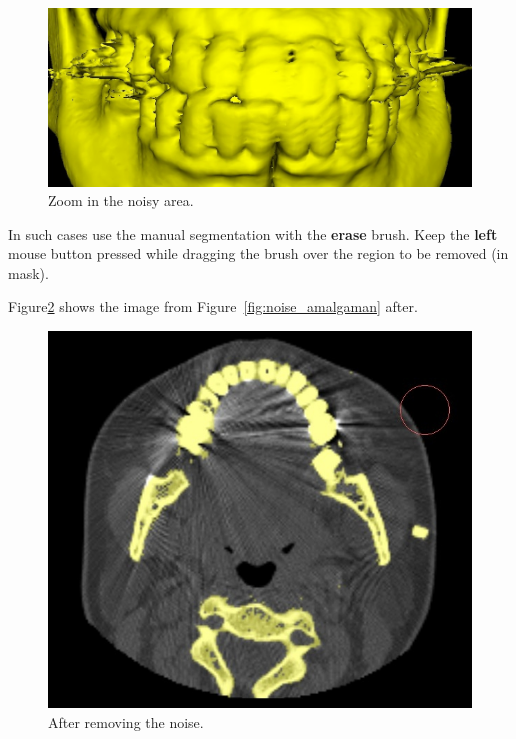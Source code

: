 \begin{figure}[!htb]
\centering
\includegraphics[scale=0.3]{../user_guide_figures/invesalius_screen/segmentation_manual_noise_amalgam_3d_zoom.jpg}
\caption{Zoom in the noisy area.}
\label{fig:surface_amagaman_zoom}
\end{figure}

In such cases use the manual segmentation with the \textbf{erase} brush. Keep the \textbf{left} mouse button pressed while dragging the brush over the region to be removed (in mask).

Figure\ref{fig:editor_amalgaman} shows the image from Figure~\ref{fig:noise_amalgaman} after.

\begin{figure}[!htb]
\centering
\includegraphics[scale=0.3]{../user_guide_figures/invesalius_screen/segmentation_manual_noise_amalgam_removed.jpg}
\caption{After removing the noise.}
\label{fig:editor_amalgaman}
\end{figure}

